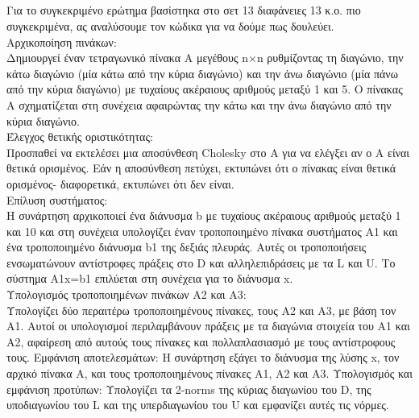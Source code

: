 \documentclass[12pt,a4paper]{article}
\begin{document}
\subsection{}
Για το συγκεκριμένο ερώτημα βασίστηκα στο σετ 13 διαφάνειες 13 κ.ο.
πιο συγκεκριμένα, ας αναλύσουμε τον κώδικα για να δούμε πως δουλεύει.\\

Αρχικοποίηση πινάκων:\\
Δημιουργεί έναν τετραγωνικό πίνακα A μεγέθους n×n ρυθμίζοντας τη διαγώνιο, την κάτω διαγώνιο (μία κάτω από την κύρια διαγώνιο) και την άνω διαγώνιο (μία πάνω από την κύρια διαγώνιο) με τυχαίους ακέραιους αριθμούς μεταξύ 1 και 5. Ο πίνακας A σχηματίζεται στη συνέχεια αφαιρώντας την κάτω και την άνω διαγώνιο από την κύρια διαγώνιο.\\

Έλεγχος θετικής οριστικότητας:\\
Προσπαθεί να εκτελέσει μια αποσύνθεση Cholesky στο 
A για να ελέγξει αν ο A είναι θετικά ορισμένος. Εάν η αποσύνθεση πετύχει, εκτυπώνει ότι ο πίνακας είναι θετικά ορισμένος- διαφορετικά, εκτυπώνει ότι δεν είναι.\\

Επίλυση συστήματος: \\
Η συνάρτηση αρχικοποιεί ένα διάνυσμα b με τυχαίους ακέραιους αριθμούς μεταξύ 1 και 10 και στη συνέχεια υπολογίζει έναν τροποποιημένο πίνακα συστήματος A1 και ένα τροποποιημένο διάνυσμα b1 της δεξιάς πλευράς. Αυτές οι τροποποιήσεις ενσωματώνουν αντίστροφες πράξεις στο D και αλληλεπιδράσεις με τα L και U. Το σύστημα A1x=b1 επιλύεται στη συνέχεια για το διάνυσμα x.\\

Υπολογισμός τροποποιημένων πινάκων A2 και A3:\\
Υπολογίζει δύο περαιτέρω τροποποιημένους πίνακες, τους A2 και A3, με βάση τον A1. Αυτοί οι υπολογισμοί περιλαμβάνουν πράξεις με τα διαγώνια στοιχεία του A1 και 
A2, αφαίρεση από αυτούς τους πίνακες και πολλαπλασιασμό με τους αντίστροφους τους.
Εμφάνιση αποτελεσμάτων: Η συνάρτηση εξάγει το διάνυσμα της λύσης x, τον αρχικό πίνακα 
A, και τους τροποποιημένους πίνακες A1, A2 και A3.
Υπολογισμός και εμφάνιση προτύπων: Υπολογίζει τα  2-norms της κύριας διαγωνίου του 
D, της υποδιαγωνίου του L και της υπερδιαγωνίου του U και εμφανίζει αυτές τις νόρμες.\\
\end{document}
